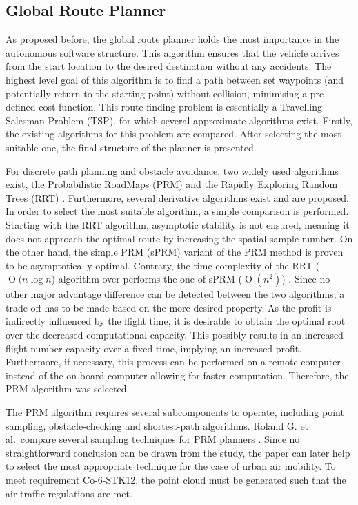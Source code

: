 \subsection{Global Route Planner}
As proposed before, the global route planner holds the most importance in the autonomous software structure.
This algorithm ensures that the vehicle arrives from the start location to the desired destination without any accidents.
The highest level goal of this algorithm is to find a path between set waypoints (and potentially return to the starting point) without collision, minimising a pre-defined cost function.
This route-finding problem is essentially a Travelling Salesman Problem (TSP), for which several approximate algorithms exist.
Firstly, the existing algorithms for this problem are compared.
After selecting the most suitable one, the final structure of the planner is presented.

 For discrete path planning and obstacle avoidance, two widely used algorithms exist, the Probabilistic RoadMaps (PRM) and the Rapidly Exploring Random Trees (RRT) \cite{PRM,RRT}.
  Furthermore, several derivative algorithms exist and are proposed.
    In order to select the most suitable algorithm, a simple comparison is performed.
        Starting with the RRT algorithm, asymptotic stability is not ensured, meaning it does not approach the optimal route by increasing the spatial sample number.
                On the other hand, the simple PRM (sPRM) variant of the PRM method is proven to be asymptotically optimal.
                                Contrary, the time complexity of the RRT ($\operatorname{O}(n\log n$) algorithm over-performs the one of sPRM ($\operatorname{O}(n^2)$) \cite{prm_rrt}.
  Since no other major advantage difference can be detected between the two algorithms, a trade-off has to be made based on the more desired property.
    As the profit is indirectly influenced by the flight time, it is desirable to obtain the optimal root over the decreased computational capacity.
        This possibly results in an increased flight number capacity over a fixed time, implying an increased profit.
                Furthermore, if necessary, this process can be performed on a remote computer instead of the on-board computer allowing for faster computation.
                                Therefore, the PRM algorithm was selected.

The PRM algorithm requires several subcomponents to operate, including point sampling, obstacle-checking and shortest-path algorithms.
Roland G. et al.\ compare several sampling techniques for PRM planners \cite{sampling}.
Since no straightforward conclusion can be drawn from the study, the paper can later help to select the most appropriate technique for the case of urban air mobility.
To meet requirement Co-6-STK12, the point cloud must be generated such that the air traffic regulations are met.

